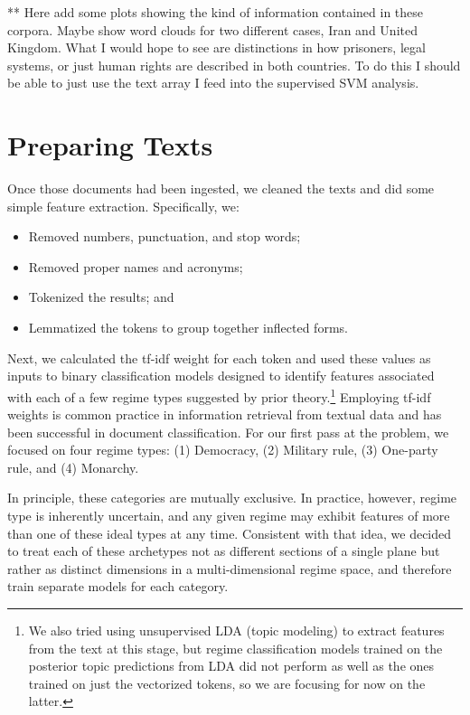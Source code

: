 \documentclass[pdftex,12pt,fullpage,oneside]{amsart}
\begin{document}
** Here add some plots showing the kind of information contained in these corpora. Maybe show word clouds for two different cases, Iran and United Kingdom. What I would hope to see are distinctions in how prisoners, legal systems, or just human rights are described in both countries. To do this I should be able to just use the text array I feed into the supervised SVM analysis. 

\section{Preparing Texts}

Once those documents had been ingested, we cleaned the texts and did some simple feature extraction. Specifically, we:

\begin{itemize}
	\item Removed numbers, punctuation, and stop words;
	\item Removed proper names and acronyms;
	\item Tokenized the results; and
	\item Lemmatized the tokens to group together inflected forms.
\end{itemize}

Next, we calculated the tf-idf weight for each token and used these values as inputs to binary classification models designed to identify features associated with each of a few regime types suggested by prior theory.\footnote{We also tried using unsupervised LDA (topic modeling) to extract features from the text at this stage, but regime classification models trained on the posterior topic predictions from LDA did not perform as well as the ones trained on just the vectorized tokens, so we are focusing for now on the latter.}  Employing tf-idf weights is common practice in information retrieval from textual data and has been successful in document classification. For our first pass at the problem, we focused on four regime types: (1) Democracy, (2) Military rule, (3) One-party rule, and (4) Monarchy.

In principle, these categories are mutually exclusive. In practice, however, regime type is inherently uncertain, and any given regime may exhibit features of more than one of these ideal types at any time. Consistent with that idea, we decided to treat each of these archetypes not as different sections of a single plane but rather as distinct dimensions in a multi-dimensional regime space, and therefore train separate models for each category.
\end{document}
